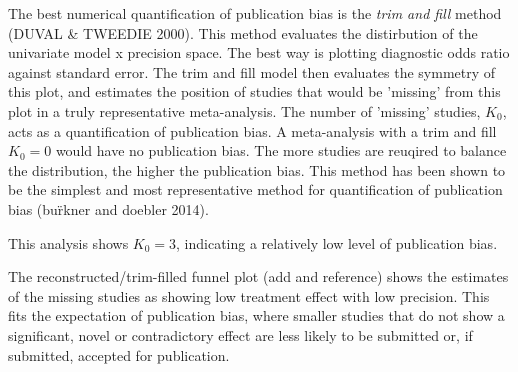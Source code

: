 The best numerical quantification of publication bias is the \emph{trim and fill} method (DUVAL \& TWEEDIE 2000).
This method evaluates the distirbution of the univariate model x precision space.
The best way is plotting diagnostic odds ratio against standard error.
The trim and fill model then evaluates the symmetry of this plot, and estimates the position of studies that would be 'missing' from this plot in a truly representative meta-analysis.
The number of 'missing' studies, $K_0$, acts as a quantification of publication bias.
A meta-analysis with a trim and fill $K_0 = 0$ would have no publication bias.
The more studies are reuqired to balance the distribution, the higher the publication bias.
This method has been shown to be the simplest and most representative method for quantification of publication bias (bu\"rkner and doebler 2014).


This analysis shows $K_0 = 3$, indicating a relatively low level of publication bias.

The reconstructed/trim-filled funnel plot (add and reference) shows the estimates of the missing studies as showing low treatment effect with low precision.
This fits the expectation of publication bias, where smaller studies that do not show a significant, novel or contradictory effect are less likely to be submitted or, if submitted, accepted for publication.
